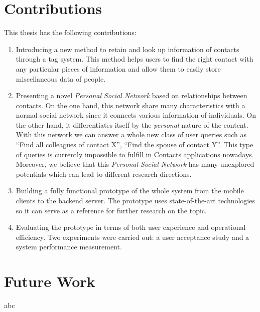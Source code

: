 \section{Contributions}
This thesis has the following contributions:

\begin{enumerate}
    \item Introducing a new method to retain and look up information of contacts through a tag system. This method helps users to find the right contact with any particular pieces of information and allow them to easily store miscellaneous data of people.
    \item Presenting a novel \textit{Personal Social Network} based on relationships between contacts. On the one hand, this network share many characteristics with a normal social network since it connects various information of individuals. On the other hand, it differentiates itself by the \textit{personal} nature of the content. With this network we can answer a whole new class of user queries such as ``Find all colleagues of contact X'', ``Find the spouse of contact Y''. This type of queries is currently impossible to fulfill in Contacts applications nowadays. Moreover, we believe that this \textit{Personal Social Network} has many unexplored potentials which can lead to different research directions.
    \item Building a fully functional prototype of the whole system from the mobile clients to the backend server. The prototype uses state-of-the-art technologies so it can serve as a reference for further research on the topic.
    \item Evaluating the prototype in terms of both user experience and operational efficiency. Two experiments were carried out: a user acceptance study and a system performance measurement.
\end{enumerate}

\section{Future Work}
abc


